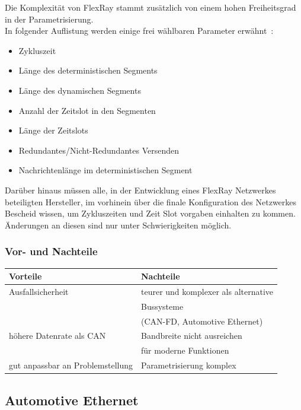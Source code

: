     Die Komplexität von FlexRay stammt zusätzlich von einem hohen Freiheitsgrad in der
    Parametrisierung.\\
    In folgender Auflistung werden einige frei wählbaren Parameter erwähnt~\cite{LA_FR2}:
    \begin{itemize}
    \item Zykluszeit
    \item Länge des deterministischen Segments
    \item Länge des dynamischen Segments
    \item Anzahl der Zeitslot in den Segmenten
    \item Länge der Zeitslots
    \item Redundantes/Nicht-Redundantes Versenden
    \item Nachrichtenlänge im deterministischen Segment
	\end{itemize}
	
    Darüber hinaus müssen alle, in der Entwicklung eines FlexRay Netzwerkes beteiligten Hersteller, im 
    vorhinein über die finale Konfiguration des Netzwerkes Bescheid wissen, um Zykluszeiten und 
    Zeit Slot vorgaben einhalten zu kommen. Änderungen an diesen sind nur unter Schwierigkeiten möglich.


    \subsubsection{Vor- und Nachteile}
    \begin{center}
        \begin{tabular}{l|l}
            \textbf{Vorteile} & \textbf{Nachteile}\\
            \hline Ausfallsicherheit & teurer und komplexer als alternative\\& Bussysteme \\&(CAN-FD, Automotive Ethernet)\\
            \hline höhere Datenrate als CAN & Bandbreite nicht ausreichen\\& für moderne Funktionen\\
            \hline gut anpassbar an Problemstellung & Parametrisierung komplex\\
            \hline
        \end{tabular}            
    \end{center}

    \graphicspath{{./Images/Kapitel4/}}
    
    \subsection{Automotive Ethernet}
